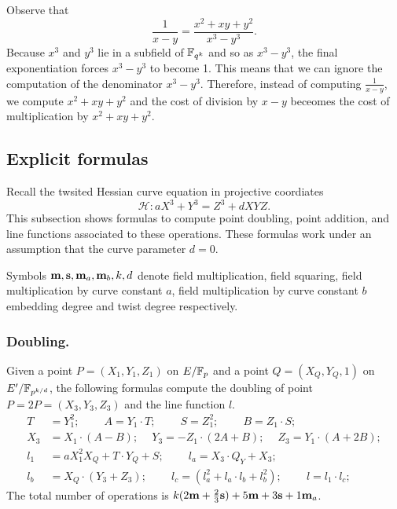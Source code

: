 Observe that
$$ \frac{1}{x-y} = \frac{x^2 + xy + y^2}{x^3 - y^3}. $$
Because $x^3$ and $y^3$ lie in a subfield of $\mathbb{F}_{q^k}$ and so as $x^3 - y^3$,
the final exponentiation forces $x^3 - y^3$ to become 1.
This means that we can ignore the computation of the denominator $x^3 - y^3$.
Therefore, instead of computing $\frac{1}{x-y}$,
we compute $x^2 + xy + y^2$
and the cost of division by $x - y$ beceomes the cost of multiplication by $x^2 + xy + y^2$.


\subsection{Explicit formulas}

Recall the twsited Hessian curve equation in projective coordiates
$$ \mathcal{H}: a X^3 + Y^3 = Z^3 + d X Y Z. $$
This subsection shows formulas to compute point doubling, point addition, and line functions associated to these operations.
These formulas work under an assumption that the curve parameter $d = 0$.

Symbols $\textbf{m}, \textbf{s}, \textbf{m}_{a}, \textbf{m}_{b}, k, d$ denote
field multiplication,
field squaring,
field multiplication by curve constant $a$,
field multiplication by curve constant $b$
embedding degree and
twist degree respectively.

\subsubsection{Doubling.}
Given a point $P = (X_1,Y_1,Z_1)$ on $E/\mathbb{F}_{p}$ and a point $Q = (X_Q,Y_Q,1)$ on $E'/\mathbb{F}_{p^{k/d}}$,
the following formulas compute the doubling of point $P = 2P = (X_3,Y_3,Z_3)$ and the line function $l$.
\begin{align*}
T &= Y_1^2;\	\qquad	A = Y_1 \cdot T;\	\qquad
S = Z_1 ^ 2;\	\qquad	B = Z_1 \cdot S;\\
X_3 &= X_1 \cdot (A - B);\	\quad
Y_3 = -Z_1 \cdot (2A + B);\	\quad
Z_3 = Y_1 \cdot (A + 2B);\\
l_1 &= a X_1^2 X_Q + T \cdot Y_Q + S;\	\qquad
l_a = X_3 \cdot Q_Y + X_3;	\\
l_b &= X_Q \cdot (Y_3 + Z_3);\			\qquad
l_c = (l_a^2 + l_a \cdot l_b + l_b^2);\		\qquad
l = l_1 \cdot l_c;
\end{align*}
The total number of operations is
$ k(2\textbf{m} + \frac{2}{3}\textbf{s}) + 5\textbf{m} +3\textbf{s} + 1\textbf{m}_a$.


